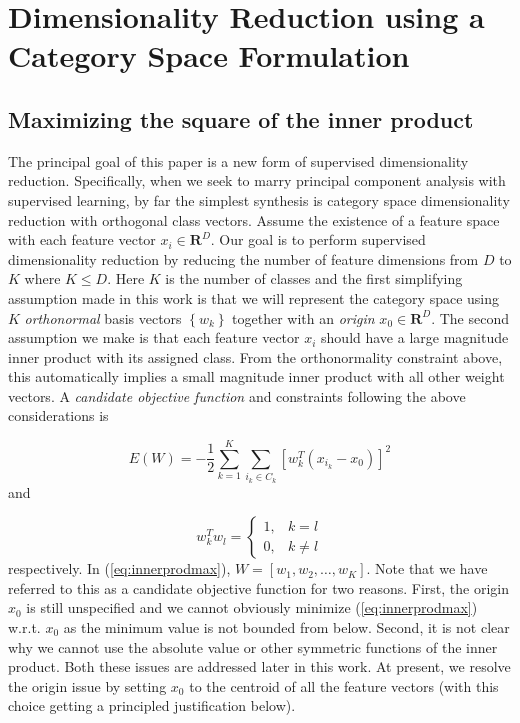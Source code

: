 
\section{Dimensionality Reduction using a Category Space Formulation\label{Category-Vector-Space}}

\subsection{Maximizing the square of the inner product}

The principal goal of this paper is a new form of supervised dimensionality
reduction. Specifically, when we seek to marry principal component
analysis with supervised learning, by far the simplest synthesis is
category space dimensionality reduction with orthogonal class vectors.
Assume the existence of a feature space with each feature vector $x_{i}\in\mathbf{R}^{D}$.
Our goal is to perform supervised dimensionality reduction by reducing
the number of feature dimensions from $D$ to $K$ where $K\leq D$.
Here $K$ is the number of classes and the first simplifying assumption
made in this work is that we will represent the category space using
$K$ \emph{orthonormal} basis vectors $\left\{ w_{k}\right\} $ together
with an \emph{origin} $x_{0}\in\mathbf{R}^{D}$. The second assumption
we make is that each feature vector $x_{i}$ should have a large magnitude
inner product with its assigned class. From the orthonormality constraint
above, this automatically implies a small magnitude inner product
with all other weight vectors. A \emph{candidate objective function}
and constraints following the above considerations is

\begin{equation}
E(W)=-\frac{1}{2}\sum_{k=1}^{K}\sum_{i_{k}\in C_{k}}\left[w_{k}^{T}\left(x_{i_{k}}-x_{0}\right)\right]^{2}\label{eq:innerprodmax}
\end{equation}
and 

\begin{equation}
w_{k}^{T}w_{l}=\left\{ \begin{array}{cc}
1, & k=l\\
0, & k\neq l
\end{array}\right.\label{eq:wkwlinner}
\end{equation}
respectively. In (\ref{eq:innerprodmax}), $W=\left[w_{1},w_{2},\ldots,w_{K}\right]$.
Note that we have referred to this as a candidate objective function
for two reasons. First, the origin $x_{0}$ is still unspecified and
we cannot obviously minimize (\ref{eq:innerprodmax}) w.r.t. $x_{0}$
as the minimum value is not bounded from below. Second, it is not
clear why we cannot use the absolute value or other symmetric functions
of the inner product. Both these issues are addressed later in this
work. At present, we resolve the origin issue by setting $x_{0}$
to the centroid of all the feature vectors (with this choice getting
a principled justification below).

